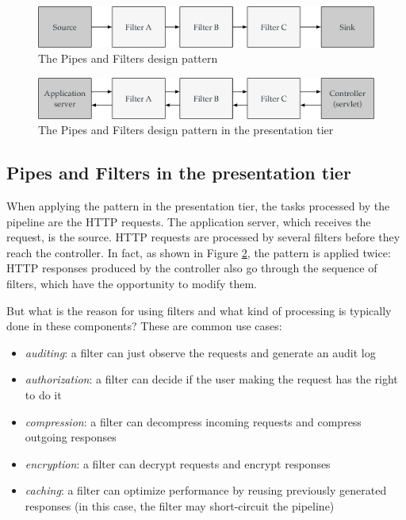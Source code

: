 \begin{figure}[]
	\centering
    \includegraphics[width=1.0\linewidth]{Figures/pipesAndFilters.pdf}
	\caption{The Pipes and Filters design pattern}
  \label{fig:pipesAndFilters}
\end{figure}

\begin{figure}[]
	\centering
    \includegraphics[width=1.0\linewidth]{Figures/pipesAndFiltersHttp.pdf}
	\caption{The Pipes and Filters design pattern in the presentation tier}
  \label{fig:pipesAndFiltersHttp}
\end{figure}

\subsection{Pipes and Filters in the presentation tier}

When applying the pattern in the presentation tier, the tasks processed by the pipeline are the HTTP requests. The application server, which receives the request, is the source. HTTP requests are processed by several filters before they reach the controller. In fact, as shown in Figure \ref{fig:pipesAndFiltersHttp}, the pattern is applied twice: HTTP responses produced by the controller also go through the sequence of filters, which have the opportunity to modify them.

But what is the reason for using filters and what kind of processing is typically done in these components? These are common use cases:

\begin{itemize}
\item \emph{auditing}: a filter can just observe the requests and generate an audit log
\item \emph{authorization}: a filter can decide if the user making the request has the right to do it
\item \emph{compression}: a filter can decompress incoming requests and compress outgoing responses
\item \emph{encryption}: a filter can decrypt requests and encrypt responses
\item \emph{caching}: a filter can optimize performance by reusing previously generated responses (in this case, the filter may short-circuit the pipeline)
\end{itemize}

